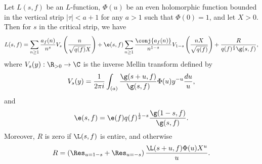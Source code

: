     \begin{theorem}
      Let $L(s,f)$ be an $L$-function, $\Phi(u)$ be an even holomorphic function bounded in the vertical strip $|\tau| < a+1$ for any $a > 1$ such that $\Phi(0) = 1$, and let $X > 0$. Then for $s$ in the critical strip, we have
      \[
        L(s,f) = \sum_{n \ge 1}\frac{a_{f}(n)}{n^{s}}V_{s}\left(\frac{n}{\sqrt{q(f)}X}\right)+\e(s,f)\sum_{n \ge 1}\frac{\conj{a_{f}(n)}}{n^{1-s}}V_{1-s}\left(\frac{nX}{\sqrt{q(f)}}\right)+\frac{R}{q(f)^{\frac{s}{2}}\g(s,f)},
      \]
      where $V_{s}(y):\R_{> 0} \to \C$ is the inverse Mellin transform defined by
      \[
        V_{s}(y) = \frac{1}{2\pi i}\int_{(a)}\frac{\g(s+u,f)}{\g(s,f)}\Phi(u)y^{-u}\frac{du}{u},
      \]
      and
      \[
        \e(s,f) = \e(f)q(f)^{\frac{1}{2}-s}\frac{\g(1-s,f)}{\g(s,f)}.
      \]
      Moreover, $R$ is zero if $\L(s,f)$ is entire, and otherwise
      \[
        R = \left(\Res_{u = 1-s}+\Res_{u = -s}\right)\frac{\L(s+u,f)\Phi(u)X^{u}}{u}.
      \]
    \end{theorem}
